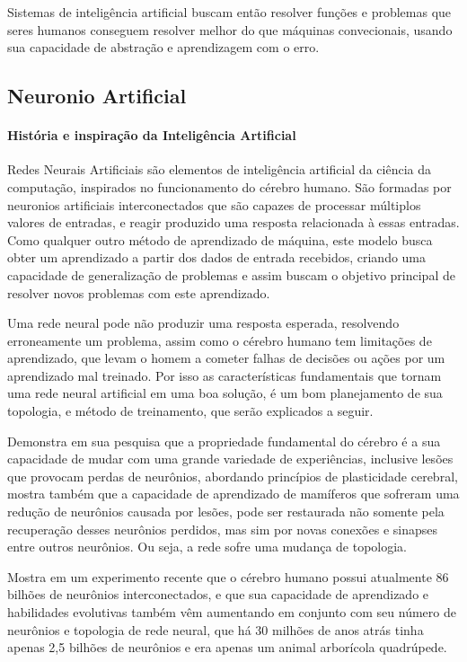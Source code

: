 \documentclass[	12pt, Times, openright, twoside, a4paper, english, brazil]{abntex2}
\begin{document}
          Sistemas de inteligência artificial buscam então resolver funções e problemas que seres humanos conseguem resolver melhor do que máquinas convecionais, usando sua capacidade de abstração e aprendizagem com o erro.

        \subsection{Neuronio Artificial}
         
          \paragraph*{História e inspiração da Inteligência Artificial}
            Redes Neurais Artificiais são elementos de inteligência artificial da ciência da computação, inspirados no funcionamento do cérebro humano.
            São formadas por neuronios artificiais interconectados que são capazes de processar múltiplos valores de entradas, e reagir produzido uma resposta relacionada à essas entradas.
            Como qualquer outro método de aprendizado de máquina, este modelo busca obter um aprendizado a partir dos dados de entrada recebidos, criando uma capacidade de generalização de problemas e assim buscam o objetivo principal de resolver novos problemas com este aprendizado.

            Uma rede neural pode não produzir uma resposta esperada, resolvendo erroneamente um problema, assim como o cérebro humano tem limitações de aprendizado, que levam o homem a cometer falhas de decisões ou ações por um aprendizado mal treinado. Por isso as características fundamentais que tornam uma rede neural artificial em uma boa solução, é um bom planejamento de sua topologia, e método de treinamento, que serão explicados a seguir.

            \cite{Muhammad2014} Demonstra em sua pesquisa que a propriedade fundamental do cérebro é a sua capacidade de mudar com uma grande variedade de experiências, inclusive lesões que provocam perdas de neurônios, abordando princípios de plasticidade cerebral, mostra também que a capacidade de aprendizado de mamíferos que sofreram uma redução de neurônios causada por lesões, pode ser restaurada não somente pela recuperação desses neurônios perdidos, mas sim por novas conexões e sinapses entre outros neurônios. Ou seja, a rede sofre uma mudança de topologia.

            \cite{Fapesp192} Mostra em um experimento recente que o cérebro humano possui atualmente 86 bilhões de neurônios interconectados, e que sua capacidade de aprendizado e habilidades evolutivas também vêm aumentando em conjunto com seu número de neurônios e topologia de rede neural, que há 30 milhões de anos atrás tinha apenas 2,5 bilhões de neurônios e era apenas um animal arborícola quadrúpede.
\end{document}
